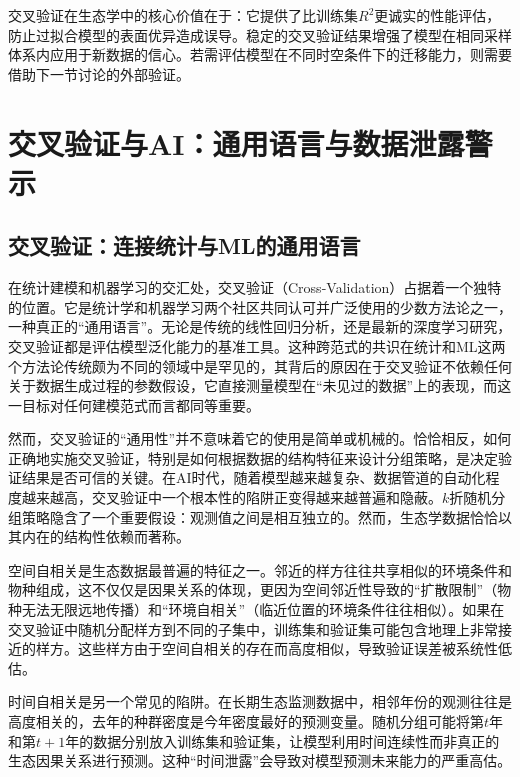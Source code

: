 \documentclass[
  twoside,12pt,fontset=none]{ctexbook}
\begin{document}
交叉验证在生态学中的核心价值在于：它提供了比训练集\(R^2\)更诚实的性能评估，防止过拟合模型的表面优异造成误导。稳定的交叉验证结果增强了模型在相同采样体系内应用于新数据的信心。若需评估模型在不同时空条件下的迁移能力，则需要借助下一节讨论的外部验证。

\hypertarget{ux4ea4ux53c9ux9a8cux8bc1ux4e0eaiux901aux7528ux8bedux8a00ux4e0eux6570ux636eux6cc4ux9732ux8b66ux793a}{%
\section{交叉验证与AI：通用语言与数据泄露警示}\label{ux4ea4ux53c9ux9a8cux8bc1ux4e0eaiux901aux7528ux8bedux8a00ux4e0eux6570ux636eux6cc4ux9732ux8b66ux793a}}

\hypertarget{ux4ea4ux53c9ux9a8cux8bc1ux8fdeux63a5ux7edfux8ba1ux4e0emlux7684ux901aux7528ux8bedux8a00}{%
\subsection{交叉验证：连接统计与ML的通用语言}\label{ux4ea4ux53c9ux9a8cux8bc1ux8fdeux63a5ux7edfux8ba1ux4e0emlux7684ux901aux7528ux8bedux8a00}}

在统计建模和机器学习的交汇处，交叉验证（Cross-Validation）占据着一个独特的位置。它是统计学和机器学习两个社区共同认可并广泛使用的少数方法论之一，一种真正的``通用语言''。无论是传统的线性回归分析，还是最新的深度学习研究，交叉验证都是评估模型泛化能力的基准工具。这种跨范式的共识在统计和ML这两个方法论传统颇为不同的领域中是罕见的，其背后的原因在于交叉验证不依赖任何关于数据生成过程的参数假设，它直接测量模型在``未见过的数据''上的表现，而这一目标对任何建模范式而言都同等重要。

然而，交叉验证的``通用性''并不意味着它的使用是简单或机械的。恰恰相反，如何正确地实施交叉验证，特别是如何根据数据的结构特征来设计分组策略，是决定验证结果是否可信的关键。在AI时代，随着模型越来越复杂、数据管道的自动化程度越来越高，交叉验证中一个根本性的陷阱正变得越来越普遍和隐蔽。\(k\)折随机分组策略隐含了一个重要假设：观测值之间是相互独立的。然而，生态学数据恰恰以其内在的结构性依赖而著称。

空间自相关是生态数据最普遍的特征之一。邻近的样方往往共享相似的环境条件和物种组成，这不仅仅是因果关系的体现，更因为空间邻近性导致的``扩散限制''（物种无法无限远地传播）和``环境自相关''（临近位置的环境条件往往相似）。如果在交叉验证中随机分配样方到不同的子集中，训练集和验证集可能包含地理上非常接近的样方。这些样方由于空间自相关的存在而高度相似，导致验证误差被系统性低估。

时间自相关是另一个常见的陷阱。在长期生态监测数据中，相邻年份的观测往往是高度相关的，去年的种群密度是今年密度最好的预测变量。随机分组可能将第\(t\)年和第\(t+1\)年的数据分别放入训练集和验证集，让模型利用时间连续性而非真正的生态因果关系进行预测。这种``时间泄露''会导致对模型预测未来能力的严重高估。
\end{document}
